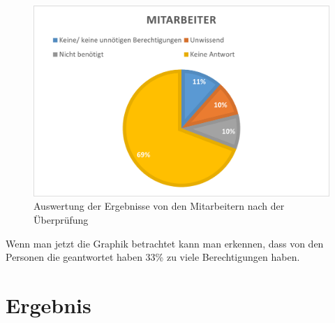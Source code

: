 \begin{figure}[h!]
 \centering
 \includegraphics[width=1\textwidth]{gfx/Picture/Mitarbeiter(korregiert).PNG}
 \caption{Auswertung der Ergebnisse von den Mitarbeitern nach der Überprüfung}
 \label{fig:MitPruf}
\end{figure}
Wenn man jetzt die Graphik betrachtet kann man erkennen, dass von den Personen die geantwortet haben 33\% zu viele Berechtigungen haben.

\section{Ergebnis}
\label{sec:Ergebnis}

